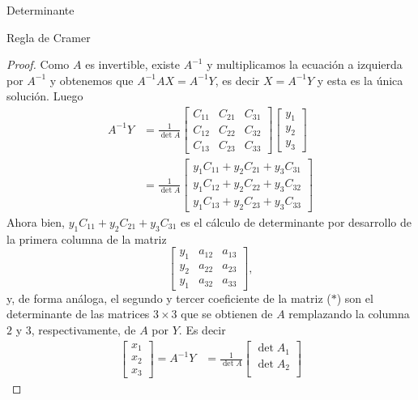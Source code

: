 \documentclass[a4paper,12pt,twoside,spanish,reqno]{amsbook}
\theoremstyle{definition}
\theoremstyle{remark}
\begin{document}
\begin{chapter}{Determinante}
\begin{section}{Regla de Cramer}
\begin{proof}
                 Como $A$  es invertible, existe $A^{-1}$ y multiplicamos la ecuación a izquierda por $A^{-1}$ y obtenemos que $A^{-1}A X = A^{-1}Y$,  es decir $X = A^{-1}Y$ y esta es la única solución. Luego
                 \begin{align*}
                 A^{-1}Y & = \frac{1}{\det A}
                 \begin{bmatrix} C_{11} & C_{21} & C_{31}\\
                 C_{12} & C_{22} &  C_{32} \\
                 C_{13} & C_{23} & C_{33}\end{bmatrix}
                 \begin{bmatrix} y_1 \\ y_2 \\ y_3 \end{bmatrix} \\
                 &= \frac{1}{\det A}\begin{bmatrix} y_1C_{11}+  y_2C_{21} + y_3C_{31}\\
                 y_1C_{12}+  y_2C_{22}+   y_3C_{32} \\
                 y_1C_{13}+  y_2C_{23}+  y_3C_{33}\end{bmatrix} \tag{$*$}
                 \end{align*}
                 Ahora bien,  $y_1C_{11}+  y_2C_{21}+   y_3C_{31}$ es el cálculo de determinante por desarrollo de la primera columna de la matriz 
                 $$
                 \begin{bmatrix}
                 y_1 & a_{12} & a_{13} \\y_2 & a_{22} & a_{23} \\y_1 & a_{32} & a_{33} 
                 \end{bmatrix},
                 $$
                 y,  de forma análoga, el segundo y tercer coeficiente de la matriz ($*$) son el determinante de las matrices $3 \times 3$ que se obtienen de $A$ remplazando la columna $2$ y $3$, respectivamente, de
                 $A$ por $Y$. Es decir
                 \begin{align*}
                 \begin{bmatrix} x_1\\
                 x_2 \\
                 x_3\end{bmatrix} = A^{-1}Y & = \frac{1}{\det A}\begin{bmatrix} \det A_1\\
                 \det A_2 \\

\end{bmatrix}
\end{align*}
\end{proof}
\end{section}
\end{chapter}
\end{document}
